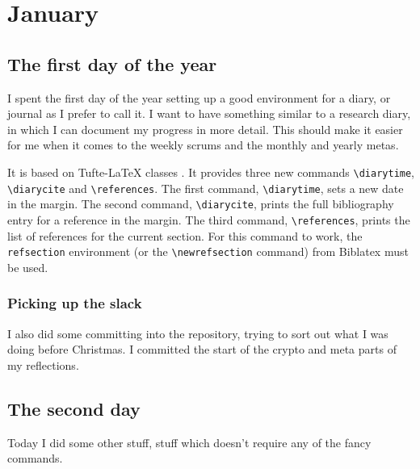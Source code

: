 \chapter{January}

\section{The first day of the year}
\newrefsection
{}
I spent the first day of the year setting up a good environment for a diary, or 
journal as I prefer to call it.
I want to have something similar to a research diary, in which I can document 
my progress in more detail.
This should make it easier for me when it comes to the weekly scrums and the 
monthly and yearly metas.

It is based on Tufte-LaTeX classes .
It provides three new commands \verb'\diarytime', \verb'\diarycite' and 
\verb'\references'.
The first command, \verb'\diarytime', sets a new date in the margin.
The second command, \verb'\diarycite', prints the full bibliography entry for 
a reference in the margin.
The third command, \verb'\references', prints the list of references for the 
current section.
For this command to work, the \verb'refsection' environment (or the 
\verb'\newrefsection' command) from Biblatex  must be used.

\subsection{Picking up the slack}
I also did some committing into the repository, trying to sort out what I was 
doing before Christmas.
I committed the start of the crypto and meta parts of my 
reflections.



\section{The second day}
Today I did some other stuff, stuff which doesn't require any of the fancy 
commands.
